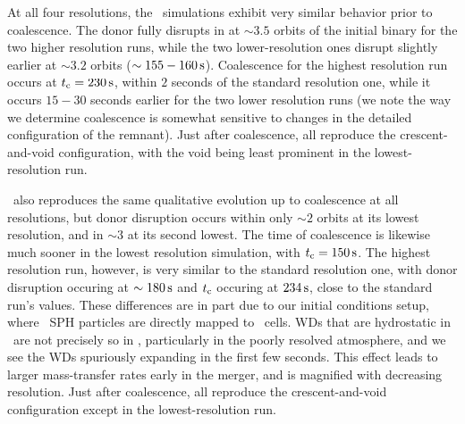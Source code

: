At all four resolutions, the \gasoline\ simulations exhibit very similar behavior prior to coalescence.  The donor fully disrupts in at $\sim3.5$ orbits of the initial binary for the two higher resolution runs, while the two lower-resolution ones disrupt slightly earlier at $\sim3.2$ orbits ($\sim155-160\,\mathrm{s}$).  Coalescence for the highest resolution run occurs at $\tcoal = 230\,\mrm{s}$, within $2$ seconds of the standard resolution one, while it occurs $15 - 30$ seconds earlier for the two lower resolution runs (we note the way we determine coalescence is somewhat sensitive to changes in the detailed configuration of the remnant).  Just after coalescence, all reproduce the crescent-and-void configuration, with the void being least prominent in the lowest-resolution run.  

\arepo\ also reproduces the same qualitative evolution up to coalescence at all resolutions, but donor disruption occurs within only $\sim2$ orbits at its lowest resolution, and in $\sim3$ at its second lowest.  The time of coalescence is likewise much sooner in the lowest resolution simulation, with $\tcoal = 150\,\mrm{s}$.  The highest resolution run, however, is very similar to the standard resolution one, with donor disruption occuring at $\sim180\,\mathrm{s}$ and $\tcoal$ occuring at $234\,\mathrm{s}$, close to the standard run's values.  These differences are in part due to our initial conditions setup, where \gasoline\ SPH particles are directly mapped to \arepo\ cells.  WDs that are hydrostatic in \gasoline\ are not precisely so in \arepo, particularly in the poorly resolved atmosphere, and we see the WDs spuriously expanding in the first few seconds.  This effect leads to larger mass-transfer rates early in the merger, and is magnified with decreasing resolution.  Just after coalescence, all reproduce the crescent-and-void configuration except in the lowest-resolution run.

